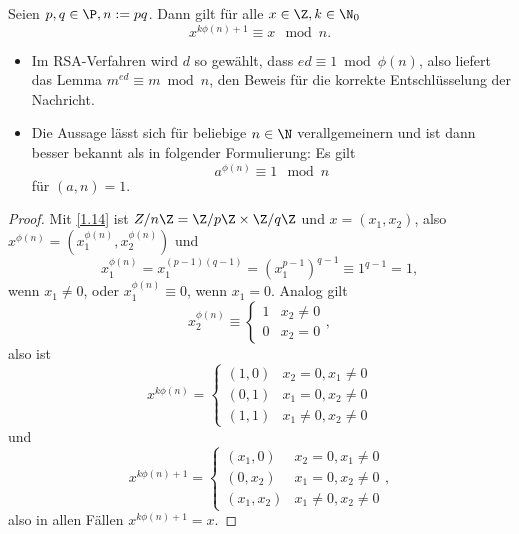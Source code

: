 \setcounter{thm}{1}
\begin{lem} \label{3.2}
	Seien $p, q \in \P, n := pq$.
	Dann gilt für alle $x \in \Z, k \in \N_0$
	\[
		x^{k\phi(n) + 1} \equiv x \mod n.
	\]
	\begin{note}
		\begin{itemize}
			\item
				Im RSA-Verfahren wird $d$ so gewählt, dass $ed \equiv 1 \bmod \phi(n)$, also liefert das Lemma $m^{ed} \equiv m \bmod n$, den Beweis für die korrekte Entschlüsselung der Nachricht.
			\item
				Die Aussage lässt sich für beliebige $n \in \N$ verallgemeinern und ist dann besser bekannt als  in folgender Formulierung: Es gilt
				\[
					a^{\phi(n)} \equiv 1 \mod n
				\]
				für $(a, n) = 1$.
		\end{itemize}
	\end{note}
	\begin{proof}
		Mit \ref{1.14} ist $Z / n\Z = \Z /p\Z \times \Z /q\Z$ und $x = (x_1, x_2)$, also $x^{\phi(n)} = (x_1^{\phi(n)}, x_2^{\phi(n)})$ und
		\[
			x_1^{\phi(n)}
			= x_1^{(p-1)(q-1)}
			= (x_1^{p-1})^{q-1}
			\equiv 1^{q-1}
			= 1,
		\]
		wenn $x_1 \neq 0$, oder $x_1^{\phi(n)} \equiv 0$, wenn $x_1 = 0$.
		Analog gilt
		\[
			x_2^{\phi(n)} \equiv \begin{cases}
				1 & x_2 \neq 0 \\
				0 & x_2 = 0
			\end{cases},
		\]
		also ist
		\[
			x^{k\phi(n)} = \begin{cases}
				(1, 0) & x_2=0, x_1 \neq 0 \\
				(0,1) & x_1=0, x_2 \neq 0 \\
				(1,1) & x_1\neq 0, x_2 \neq 0
			\end{cases}
		\]
		und
		\[
			x^{k\phi(n) + 1} = \begin{cases}
				(x_1, 0) & x_2=0, x_1 \neq 0 \\
				(0,x_2) & x_1=0, x_2 \neq 0 \\
				(x_1,x_2) & x_1\neq 0, x_2 \neq 0
			\end{cases},
		\]
		also in allen Fällen $x^{k\phi(n) + 1} = x$.
	\end{proof}
\end{lem}


